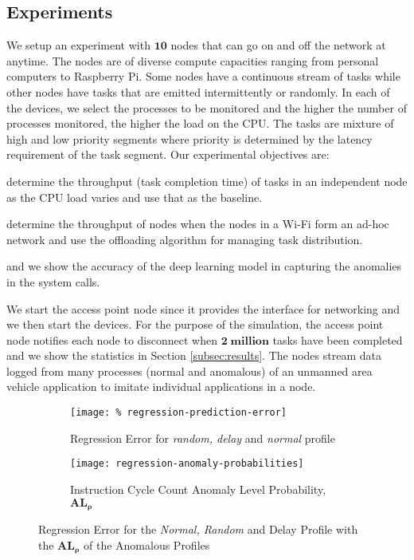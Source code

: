 \subsection{Experiments}
\label{subsec:experiments}
We setup an experiment with $ \bm{10} $ nodes that can go on 
and off the network at anytime. The nodes are of diverse 
compute capacities ranging from personal computers to 
Raspberry Pi. Some nodes 
have a continuous stream of tasks while other nodes have 
tasks 
that are emitted intermittently or randomly. In each of the 
devices, we 
select the processes to be monitored and the higher the 
number of processes monitored, the higher the load on the 
CPU. The tasks are mixture of high and low priority segments 
where priority is determined by the latency requirement of 
the task segment. Our experimental objectives are:
\begin{enumerate*}[label={\alph*)},font={\bfseries}]
	\item determine the throughput (task completion time) of 
	tasks in an independent node as the CPU load varies 
	and use 
	that as the baseline. 
	\item determine the throughput of 
	nodes when 
	the nodes in a Wi-Fi form an ad-hoc network and use the 
	offloading algorithm for managing task distribution. 
	\item and we show the accuracy of the deep learning model 
	in capturing the anomalies in the system calls.
\end{enumerate*}
We start the access point node since it provides the 
interface for networking and we then start the devices. For 
the purpose of the simulation, the access point node notifies 
each node to disconnect when $ \bm{2\; \text{million}} $ 
tasks 
have been completed and we show the statistics in Section 
\ref{subsec:results}. The nodes stream data logged from 
many processes (normal and anomalous) of an unmanned area 
vehicle application to imitate individual applications in a 
node.

\begin{figure*}
	\centering
	\begin{subfigure}{0.5\textwidth}
		\centering
		\texttt{[image: \%
			regression-prediction-error]}
		\caption{Regression Error for \emph{random, delay} 
		and \emph{normal} profile}
		\label{fig:regression-error}
	\end{subfigure}%
	\begin{subfigure}{0.5\textwidth}
		\centering
		\texttt{[image: regression-anomaly-probabilities]}
		\caption{Instruction Cycle Count Anomaly Level 
		Probability, $ 
			\bm{AL_{\rho}} 
			$ }
		\label{fig:ALP}
	\end{subfigure}
	\caption{Regression Error for the \emph{Normal, Random} 
		and  Delay Profile with the $ \bm{AL_{\rho}}$ of the 
		Anomalous Profiles}
	\label{fig:error-ALp}
\end{figure*}

